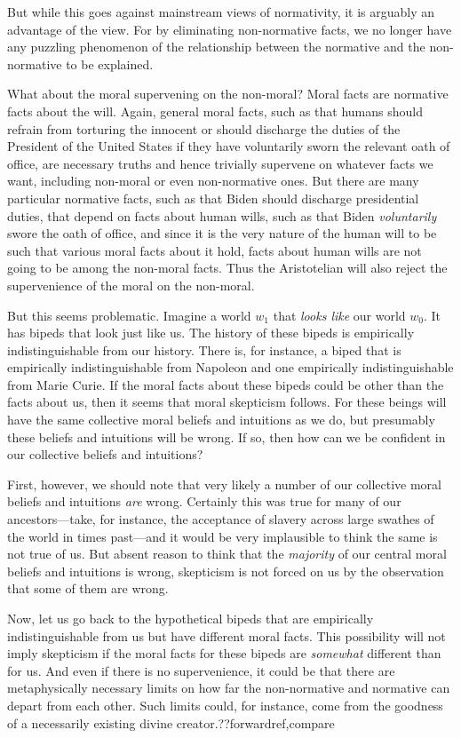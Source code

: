 But while this goes against mainstream views of normativity, it is arguably an advantage of the
view. For by eliminating non-normative facts, we no longer have any puzzling phenomenon of the relationship 
between the normative and the non-normative to be explained. 

What about the moral supervening on the non-moral? Moral facts are normative facts about the
will. Again, general moral facts, such as that humans should refrain from torturing the innocent or should
discharge the duties of the President of the United States if they have voluntarily sworn the
relevant oath of office,
are necessary truths and hence trivially supervene on whatever facts we want, including
non-moral or even non-normative ones. But there are many particular normative facts, such as
that Biden should discharge presidential duties, that depend on facts about human wills,
such as that Biden \textit{voluntarily} swore the oath of office, and since it is the very nature
of the
human will to be such that various moral facts about it hold, facts about human wills are not going
to be among the non-moral facts. Thus the Aristotelian will also reject the supervenience of the
moral on the non-moral.

But this seems problematic. Imagine a world $w_1$ that \textit{looks like} our world $w_0$. It has bipeds that look 
just like us. The history of these bipeds
is empirically indistinguishable from our history. 
There is, for instance, a biped that is empirically indistinguishable from Napoleon and
one empirically indistinguishable from Marie Curie. If the moral facts about
these bipeds could be other than the facts about us, then it seems that moral skepticism follows.
For these beings will have the same collective moral beliefs and intuitions as we do, but presumably these 
beliefs and intuitions will be wrong. If so, then how can we be confident in our collective beliefs and 
intuitions?

First, however, we should note that very likely a number of our collective moral beliefs and intuitions \textit{are}
wrong. Certainly this was true for many of our ancestors---take, for instance, the acceptance of
slavery across large swathes of the world in times past---and it would be very implausible to think the 
same is not true of us. But absent reason to think that the \textit{majority} of our central moral beliefs and 
intuitions is wrong, skepticism is not forced on us by the observation that some of them are wrong. 

Now, let us go back to the hypothetical bipeds that are empirically indistinguishable from us but have 
different moral facts. This possibility will not imply skepticism if the moral facts for these bipeds are
\textit{somewhat} different than for us. And even if there is no supervenience, it could be that there are 
metaphysically necessary limits on how far the non-normative and normative can depart from each other. Such 
limits could, for instance, come from the goodness of a necessarily existing divine creator.??forwardref,compare 


